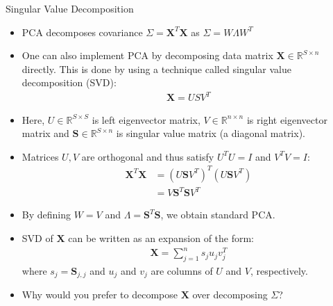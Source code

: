 \documentclass[handout,9pt]{beamer}
\begin{document}
\begin{frame}{Singular Value Decomposition}

\begin{itemize}
\setlength{\itemsep}{3pt}
\item PCA decomposes covariance $\Sigma=\mathbf{X}^T\mathbf{X}$ as $\Sigma=W\Lambda W^T$

\item One can also implement PCA by decomposing data matrix $\mathbf{X}\in\mathbb{R}^{S\times n}$ directly. This is done by using a technique called singular value decomposition (SVD):
\begin{align*}
\mathbf{X}=USV^T
\end{align*}
\item Here, $U\in \mathbb{R}^{S\times S}$ is left eigenvector matrix, $V\in \mathbb{R}^{n\times n}$ is right eigenvector matrix and $\mathbf{S}\in \mathbb{R}^{S\times n}$ is singular value matrix (a diagonal matrix). 
\item Matrices $U,V$ are orthogonal and thus satisfy $U^TU=I$ and $V^TV=I$:
\begin{align*}
\mathbf{X}^T\mathbf{X}&=(U\mathbf{S}V^T)^T(U\mathbf{S}V^T)\\
&=V\mathbf{S}^T\mathbf{S}V^T
\end{align*}
\item By defining $W=V$ and $\Lambda=\mathbf{S}^T\mathbf{S}$, we obtain standard PCA. 
\item SVD of $\mathbf{X}$ can be written as an expansion of the form:
\begin{align*}
\mathbf{X}=\sum_{j=1}^ns_ju_jv_j^T
\end{align*}
where $s_j=\mathbf{S}_{j,j}$ and $u_j$ and $v_j$ are columns of $U$ and $V$, respectively. 
\item Why would you prefer to decompose $\mathbf{X}$ over decomposing $\Sigma$?
 
\end{itemize}


\end{frame}
\end{document}
